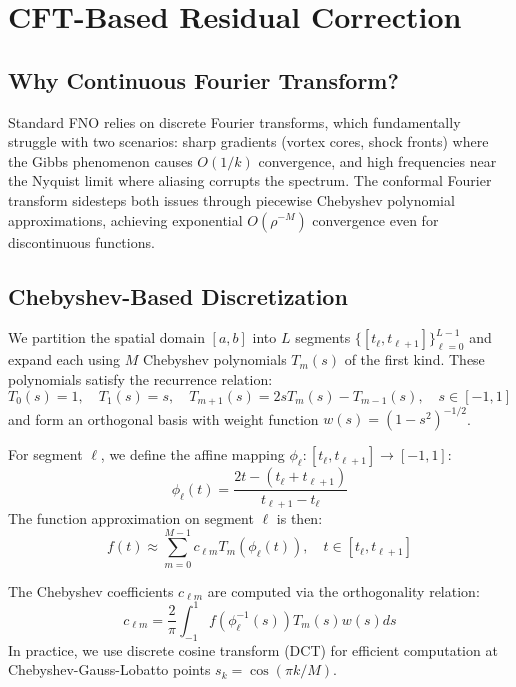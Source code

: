 \documentclass[11pt]{article}
\begin{document}
\section{CFT-Based Residual Correction}

\subsection{Why Continuous Fourier Transform?}

Standard FNO relies on discrete Fourier transforms, which fundamentally struggle with two scenarios: sharp gradients (vortex cores, shock fronts) where the Gibbs phenomenon causes $O(1/k)$ convergence, and high frequencies near the Nyquist limit where aliasing corrupts the spectrum. The conformal Fourier transform \citep{barnett2010conformal} sidesteps both issues through piecewise Chebyshev polynomial approximations, achieving exponential $O(\rho^{-M})$ convergence even for discontinuous functions.

\subsection{Chebyshev-Based Discretization}

We partition the spatial domain $[a,b]$ into $L$ segments $\{[t_\ell, t_{\ell+1}]\}_{\ell=0}^{L-1}$ and expand each using $M$ Chebyshev polynomials $T_m(s)$ of the first kind. These polynomials satisfy the recurrence relation:
\begin{equation}
T_0(s) = 1, \quad T_1(s) = s, \quad T_{m+1}(s) = 2s T_m(s) - T_{m-1}(s), \quad s \in [-1,1]
\end{equation}
and form an orthogonal basis with weight function $w(s) = (1-s^2)^{-1/2}$.

For segment $\ell$, we define the affine mapping $\phi_\ell: [t_\ell, t_{\ell+1}] \to [-1,1]$:
\begin{equation}
\phi_\ell(t) = \frac{2t - (t_\ell + t_{\ell+1})}{t_{\ell+1} - t_\ell}
\end{equation}
The function approximation on segment $\ell$ is then:
\begin{equation}
f(t) \approx \sum_{m=0}^{M-1} c_{\ell m} T_m(\phi_\ell(t)), \quad t \in [t_\ell, t_{\ell+1}]
\end{equation}

The Chebyshev coefficients $c_{\ell m}$ are computed via the orthogonality relation:
\begin{equation}
c_{\ell m} = \frac{2}{\pi} \int_{-1}^{1} f(\phi_\ell^{-1}(s)) T_m(s) w(s) ds
\end{equation}
In practice, we use discrete cosine transform (DCT) for efficient computation at Chebyshev-Gauss-Lobatto points $s_k = \cos(\pi k/M)$.
\end{document}

